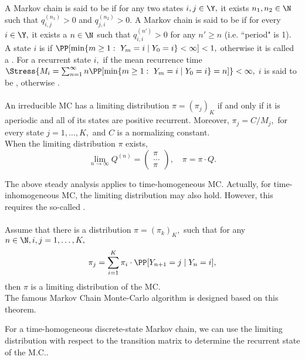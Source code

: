     	A Markov chain is said to be  if for any 
	two states $i,j\in \Y,$ it exists $n_1, n_2\in \N$ such that
	$q_{i,j}^{(n_1)}>0$ and $q_{j,i}^{(n_2)}>0.$ A Markov chain
	is said to be  if for every $i\in \Y,$ it exists a $n\in \N$ such that $q_{i,i}^{(n')}>0$	for any $n'\ge n$ (i.e. ``period" is 1). \\[1ex]
	\hspace{0.5cm}A state $i$ is  if $\PP[\min\{m\ge 1:\  Y_{m}=i\mid Y_0=i\}<\infty]<1,$
	otherwise it is called a . For a recurrent state
	$i,$ if the mean recurrence time $\Stress{M_i=\sum_{n=1}^{\infty} n\PP[\min \{m\ge 1:\  Y_{m}=i\mid Y_0=i\}=n]}<\infty,$ $i$ is said to be , otherwise .\\[1ex]
	\\
	An irreducible MC has a limiting distribution $\pi=(\pi_j)_K$ if and only if
	it is aperiodic and all of its states are positive recurrent. Moreover, $\pi_j=C/M_j,$ for every state $j=1,\ldots, K,$ and $C$ is
	a normalizing constant.\\[1ex]
	\hspace{0.5cm}When the limiting distribution $\pi$ exists, 
	\[
	\lim_{n\to\infty}Q^{(n)}=\left(
	\begin{array}{c}
	\pi\\
	\ldots\\
	\pi
	\end{array}
	\right),
	\quad \pi=\pi\cdot Q.
	\] 

	The above steady analysis applies to time-homogeneous MC. Actually, for time-inhomogeneous MC, the limiting distribution may also hold. However, this requires the so-called . \\[1ex]
	\\
	Assume that there is a distribution $\pi=(\pi_k)_K,$ such that
	for any $n\in \N, i,j=1,\ldots,K,$ 
	\[
	\pi_j=\sum_{i=1}^{K} \pi_i\cdot \PP[Y_{n+1}=j\mid Y_{n}=i],
	\]
	then $\pi$ is a limiting distribution of the MC.\\[1ex]
	 The famous Markov Chain Monte-Carlo algorithm is
	designed based on this theorem.

\begin{note}
      For a time-homogeneous discrete-state Markov chain, we can use the limiting distribution 
      with respect to the transition matrix to determine the recurrent state of the M.C..
\end{note}

